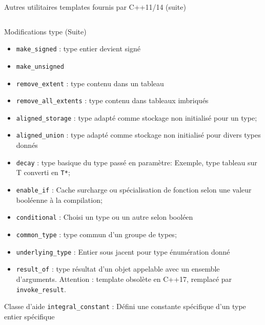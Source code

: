 \documentclass[handout,10pt]{beamer}
\begin{document}
\begin{frame}[fragile]{Autres utilitaires templates fournis par C++11/14 (suite)}
\begin{columns}
\begin{column}{0.49\textwidth}
\begin{block}{Modifications type (Suite)}
\begin{itemize}
\item {\color{blue}\lstinline$make_signed$} : type entier devient signé
\item {\color{blue}\lstinline$make_unsigned$}
\item {\color{blue}\lstinline$remove_extent$} :  type contenu dans un tableau
\item {\color{blue}\lstinline$remove_all_extents$}  : type contenu dans tableaux imbriqués
\item {\color{blue}\lstinline$aligned_storage$} : type adapté comme stockage non initialisé pour un type;
\item {\color{blue}\lstinline$aligned_union$} : type adapté comme stockage non initialisé pour divers types donnés
\item {\color{blue}\lstinline$decay$} : type basique du type passé en paramètre: {\color{DarkGreen}Exemple}, type tableau sur T converti en \lstinline$T*$;
\item {\color{blue}\lstinline$enable_if$} : Cache surcharge ou spécialisation de fonction selon une valeur booléenne à la compilation;
\item {\color{blue}\lstinline$conditional$} : Choisi un type ou un autre selon booléen
\item {\color{blue}\lstinline$common_type$} : type commun d'un groupe de types;
\item {\color{blue}\lstinline$underlying_type$} : Entier sous jacent pour type énumération donné
\item {\color{blue}\lstinline$result_of$} : type résultat d'un objet appelable avec un ensemble d'arguments. \alert{Attention} : template obsolète en C++17, remplacé par \lstinline$invoke_result$.
\end{itemize}
\end{block}
\begin{block}{Classe d'aide}
{\color{blue}\lstinline$integral_constant$} : Défini une constante spécifique d'un type entier spécifique
\end{block}
\end{column}
\end{columns}
\end{frame}
\end{document}
